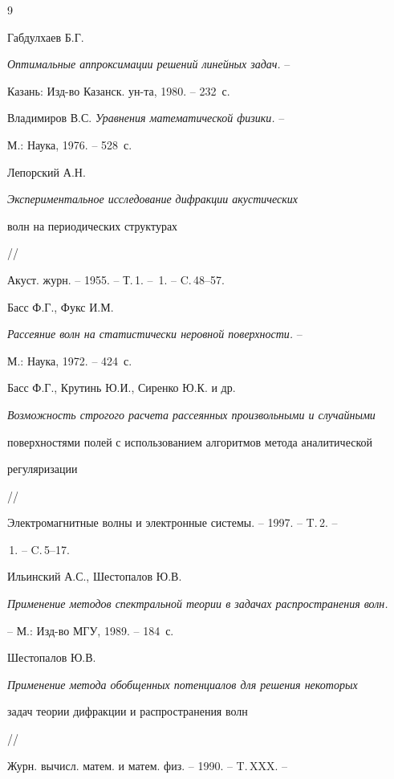 \begin{thebibliography}{9}







Габдулхаев Б.Г.


{\it Оптимальные аппроксимации решений линейных задач.} --


Казань: Изд-во Казанск. ун-та, 1980. -- 232~с.




Владимиров В.С. {\it Уравнения математической физики.} --


М.: Наука, 1976. -- 528~с.




Лепорский А.Н. {\it Экспериментальное исследование дифракции акустических


волн на периодических структурах} //


Акуст. журн. -- 1955. -- Т.\,1. -- \No\,1. -- C.\,48--57.




Басс Ф.Г., Фукс И.М.


{\it Рассеяние волн на статистически неровной поверхности.} --


М.: Наука, 1972. -- 424~с.




Басс Ф.Г., Крутинь Ю.И., Сиренко Ю.К. и др.


{\it Возможность строгого расчета рассеянных произвольными и случайными


поверхностями полей с использованием алгоритмов метода аналитической


регуляризации} //


Электромагнитные волны и электронные системы. -- 1997. -- T.\,2. --


\No\,1. -- C.\,5--17.




Ильинский А.С., Шестопалов Ю.В.


{\it Применение методов спектральной теории в задачах распространения волн.}


-- М.: Изд-во МГУ, 1989. -- 184~с.




Шестопалов Ю.В.


{\it Применение метода обобщенных потенциалов для решения некоторых


задач теории дифракции и распространения волн} //


Журн. вычисл. матем. и матем. физ. -- 1990. -- T.\,XXX. --



\end{thebibliography}
